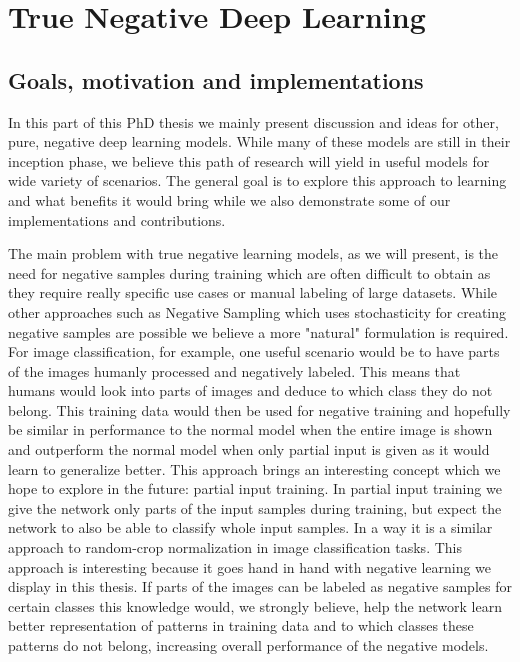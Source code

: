 \documentclass[b5paper]{book}
\begin{document}
\part{True Negative Deep Learning}

\chapter{Goals, motivation and implementations}
In this part of this PhD thesis we mainly present discussion and ideas for other, pure, negative deep learning models. While many of these models are still in their inception phase, we believe this path of research will yield in useful models for wide variety of scenarios. The general goal is to explore this approach to learning and what benefits it would bring while we also demonstrate some of our implementations and contributions.

The main problem with true negative learning models, as we will present, is the need for negative samples during training which are often difficult to obtain as they require really specific use cases or manual labeling of large datasets. While other approaches such as Negative Sampling which uses stochasticity for creating negative samples are possible we believe a more "natural" formulation is required. For image classification, for example, one useful scenario would be to have parts of the images humanly processed and negatively labeled. This means that humans would look into parts of images and deduce to which class they do not belong. This training data would then be used for negative training and hopefully be similar in performance to the normal model when the entire image is shown and outperform the normal model when only partial input is given as it would learn to generalize better. This approach brings an interesting concept which we hope to explore in the future: partial input training. In partial input training we give the network only parts of the input samples during training, but expect the network to also be able to classify whole input samples. In a way it is a similar approach to random-crop normalization in image classification tasks. This approach is interesting because it goes hand in hand with negative learning we display in this thesis. If parts of the images can be labeled as negative samples for certain classes this knowledge would, we strongly believe, help the network learn better representation of patterns in training data and to which classes these patterns do not belong, increasing overall performance of the negative models.
\end{document}
